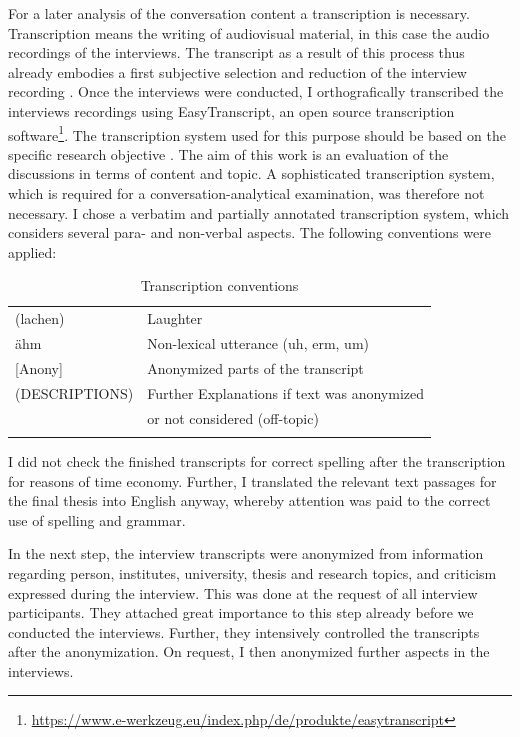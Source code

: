 \documentclass[12pt, a4paper, titlepage, oneside, abstract=true, toc=listof, toc=bibliography]{scrreprt}
\begin{document}
For a later analysis of the conversation content a transcription is necessary. Transcription means the writing of audiovisual material, in this case the audio recordings of the interviews. The transcript as a result of this process thus already embodies a first subjective selection and reduction of the interview recording \citep[p. 321]{Edwards2003}. Once the interviews were conducted, I orthografically transcribed the interviews recordings using EasyTranscript, an open source transcription software\footnote{\url{https://www.e-werkzeug.eu/index.php/de/produkte/easytranscript}}. The transcription system used for this purpose should be based on the specific research objective \citep[p. 331]{Edwards2003}. The aim of this work is an evaluation of the discussions in terms of content and topic. A sophisticated transcription system, which is required for a conversation-analytical examination, was therefore not necessary. I chose a verbatim and partially annotated transcription system, which considers several para- and non-verbal aspects. The following conventions were applied:

\small
\begin{table}
\caption{Transcription conventions}
\centering
\begin{tabular}{ll}
 & \\
\hline
\hline
 	(lachen) & Laughter\\
 	ähm	& Non-lexical utterance (uh, erm, um)\\
 	{[Anony]} & Anonymized parts of the transcript\\
	(DESCRIPTIONS)	& Further Explanations if text was anonymized\\
	               & or not considered (off-topic)\\
\hline
 & \\
\end{tabular}
\end{table}
\normalsize

I did not check the finished transcripts for correct spelling after the transcription for reasons of time economy. Further, I translated the relevant text passages for the final thesis into English anyway, whereby attention was paid to the correct use of spelling and grammar.

In the next step, the interview transcripts were anonymized from information regarding person, institutes, university, thesis and research topics, and criticism expressed during the interview. This was done at the request of all interview participants. They attached great importance to this step already before we conducted the interviews. Further, they intensively controlled the transcripts after the anonymization. On request, I then anonymized further aspects in the interviews.
\end{document}
